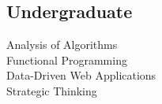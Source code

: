 \documentclass[]{deedy-resume-openfont}
\begin{document}
\begin{minipage}[t]{0.33	\textwidth}
\subsection{Undergraduate}
Analysis of Algorithms \\
Functional Programming \\
Data-Driven Web Applications \\
Strategic Thinking\\


\sectionsep



%
%
\spacerone
\spacerone
\spacerone
\spacerone
\spacerone


\end{minipage}
\end{document}
